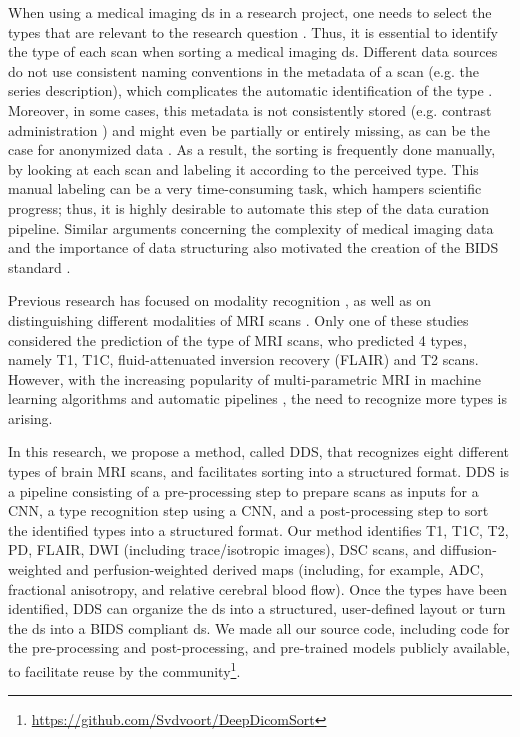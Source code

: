 When using a medical imaging \gls{ds} in a research project, one needs to select the \glspl{type} that are relevant to the research question \autocite{montagnon2020deep, lambin2017radiomics}.
Thus, it is essential to identify the \gls{type} of each \gls{scan} when sorting a medical imaging \gls{ds}.
Different data sources do not use consistent naming conventions in the metadata of a \gls{scan} (e.g. the series description), which complicates the automatic identification of the \gls{type} \autocite{vanooijen2019quality, wang2011automated}.
Moreover, in some cases, this metadata is not consistently stored (e.g. contrast administration \autocite{hirsch2015we}) and might even be partially or entirely missing, as can be the case for anonymized data \autocite{moore2015identification}.
As a result, the sorting is frequently done manually, by looking at each \gls{scan} and labeling it according to the perceived \gls{type}.
This manual labeling can be a very time-consuming task, which hampers scientific progress; thus, it is highly desirable to automate this step of the data curation pipeline.
Similar arguments concerning the complexity of medical imaging data and the importance of data structuring also motivated the creation of the \gls{BIDS} standard \autocite{gorgolewski2016brain}.

Previous research has focused on modality recognition \autocite{dimitrovski2015improved,yu2015modality,arias2016medical}, as well as on distinguishing different modalities of \gls{MRI} \glspl{scan} \autocite{srinivas2014medical,remedios2018classifying}.
Only one of these studies \autocite{remedios2018classifying} considered the prediction of the \gls{type} of \gls{MRI} \glspl{scan}, who predicted \num{4} \glspl{type}, namely \gls{T1}, \gls{T1C}, fluid-attenuated inversion recovery (FLAIR) and \gls{T2} \glspl{scan}.
However, with the increasing popularity of multi-parametric \gls{MRI} in machine learning algorithms and automatic pipelines \autocite{li2017deep,akkus2017predicting,nie20163d,pereira2015deep}, the need to recognize more \glspl{type} is arising.

In this research, we propose a method, called \gls{DDS}, that recognizes eight different \glspl{type} of brain \gls{MRI} \glspl{scan}, and facilitates sorting into a structured format.
\gls{DDS} is a pipeline consisting of a pre-processing step to prepare \glspl{scan} as inputs for a \gls{CNN}, a \gls{type} recognition step using a \gls{CNN}, and a post-processing step to sort the identified \glspl{type} into a structured format.
Our method identifies \gls{T1}, \gls{T1C}, \gls{T2}, \gls{PD}, \gls{FLAIR}, \gls{DWI} (including trace/isotropic images), \gls{DSC} \glspl{scan}, and diffusion-weighted and perfusion-weighted derived maps (including, for example, \gls{ADC}, fractional anisotropy, and relative cerebral blood flow).
Once the \glspl{type} have been identified, \gls{DDS} can organize the \gls{ds} into a structured, user-defined layout or turn the \gls{ds} into a \gls{BIDS} compliant \gls{ds}.
We made all our source code, including code for the pre-processing and post-processing, and pre-trained models publicly available, to facilitate reuse by the community\footnote{\url{https://github.com/Svdvoort/DeepDicomSort}}.


